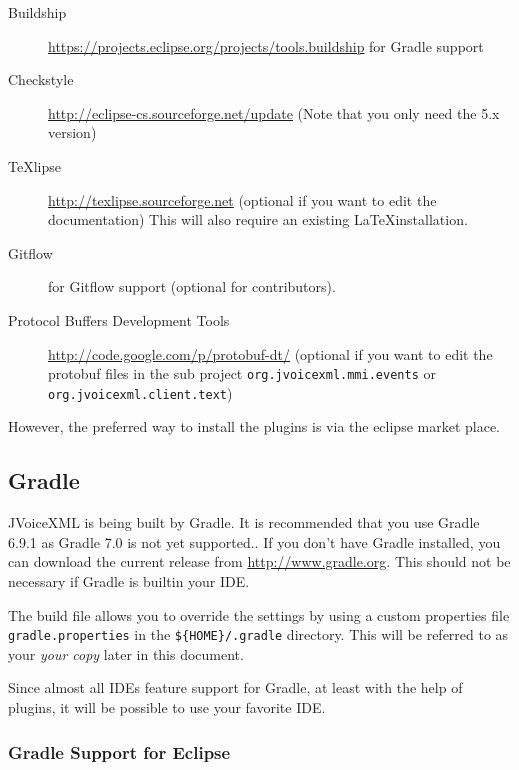 \documentclass[11pt,a4paper]{article}
\begin{document}
\begin{description}
\item[Buildship] \url{https://projects.eclipse.org/projects/tools.buildship} for Gradle support
\item[Checkstyle] \url{http://eclipse-cs.sourceforge.net/update} (Note that you
only need the 5.x version)
\item[TeXlipse] \url{http://texlipse.sourceforge.net} (optional if you want to
edit the documentation) This will also require an existing \LaTeX installation.
\item[Gitflow] for Gitflow support (optional for contributors).
\item[Protocol Buffers Development Tools] \url{http://code.google.com/p/protobuf-dt/}
(optional if you want to edit the protobuf files in the sub project
\texttt{org.jvoicexml.mmi.events} or \texttt{org.jvoicexml.client.text})
\end{description}

However, the preferred way to install the plugins is via the eclipse market place.

\subsection{Gradle}
\label{sec:gradle}

JVoiceXML is being built by Gradle. It is recommended that
you use Gradle 6.9.1 as Gradle 7.0 is not yet supported.. 
If you don't have Gradle installed, you can download the current release
from \url{http://www.gradle.org}. This should not be necessary if Gradle is builtin
your IDE.

The build file allows you to override the settings by using a custom 
properties file \texttt{gradle.properties} in the \texttt{\$\{HOME\}/.gradle}
directory. This will be referred to as your \emph{your copy} later in this document.

Since almost all IDEs feature support for Gradle, at least with the help of plugins, it will be possible to
use your favorite IDE.


\subsubsection{Gradle Support for Eclipse}
\label{sec:gradle-eclipse}
\end{document}
